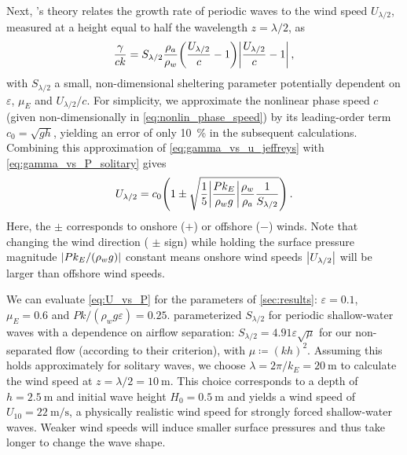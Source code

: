 \documentclass{jfm}
\renewcommand*{\epsilon}{\varepsilon}
\begin{document}
Next, \citeauthor{jeffreys1925formation}'s
\citeyearpar{jeffreys1925formation} theory relates the growth rate of
periodic waves to the wind speed $U_{\lambda/2}$,
measured at a height equal to half the wavelength $z=\lambda/2$, as
\begin{equation}
  \frac{\gamma}{c k} = S_{\lambda/2} \frac{\rho_a}{\rho_w}
    \pqty{\frac{U_{\lambda/2}}{c}-1}
    \abs{\frac{U_{\lambda/2}}{c}-1} \,,
  \label{eq:gamma_vs_u_jeffreys}
\end{equation}
with $S_{\lambda/2}$ a small, non-dimensional sheltering parameter
potentially dependent on $\epsilon$, $\mu_E$ and $U_{\lambda/2}/c$.
For simplicity, we approximate the nonlinear phase speed $c$ (given
non-dimensionally in \ref{eq:nonlin_phase_speed}) by its leading-order
term $c_0 = \sqrt{gh}$, yielding an error of only \SI{10}{\percent} in
the subsequent calculations.
Combining this approximation of \cref{eq:gamma_vs_u_jeffreys} with
\cref{eq:gamma_vs_P_solitary} gives
\begin{equation}
  U_{\lambda/2} = c_0 \pqty{1 \pm \sqrt{\frac{1}{5} \abs{\frac{P k_E}{\rho_w g}}
    \frac{\rho_w}{\rho_a} \frac{1}{S_{\lambda/2}}}} \,.
  \label{eq:U_vs_P}
\end{equation}
Here, the $\pm$ corresponds to onshore ($+$) or offshore ($-$) winds.
Note that changing the wind direction (\ie{} $\pm$ sign) while holding
the surface pressure magnitude $\abs{Pk_E/(\rho_w g)}$ constant means
onshore wind speeds $\abs{U_{\lambda/2}}$ will be larger than offshore
wind speeds.

We can evaluate \cref{eq:U_vs_P} for the parameters of
\cref{sec:results}: $\epsilon=0.1$, $\mu_E = 0.6$ and $Pk/(\rho_w g
\epsilon) = 0.25$.
 parameterized $S_{\lambda/2}$ for
periodic shallow-water waves with a dependence on airflow separation:
$S_{\lambda/2} = 4.91 \epsilon \sqrt{\mu}$ for our non-separated
flow (according to their criterion), with $\mu \coloneqq (kh)^2$.
Assuming this holds approximately for solitary waves, we choose $\lambda
= 2 \pi/k_E = \SI{20}{\meter}$ to calculate the wind speed at $z
= \lambda/2 = \SI{10}{\meter}$.
This choice corresponds to a depth of $h = \SI{2.5}{\meter}$ and initial
wave height $H_0 = \SI{0.5}{\meter}$ and yields a wind speed of $U_{10}
= \SI{22}{\meter\per\second}$, a physically realistic wind speed for
strongly forced shallow-water waves.
Weaker wind speeds will induce smaller surface pressures and thus take
longer to change the wave shape.
\end{document}
